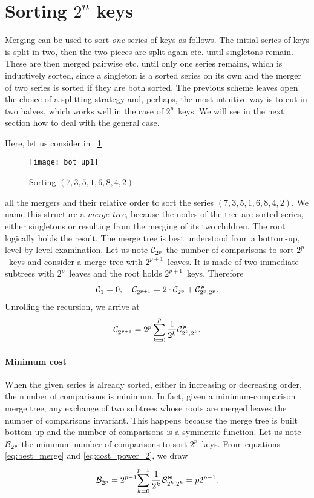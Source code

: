 \section{Sorting $2^n$ keys}

Merging can be used to sort \emph{one} series of keys as follows. The
initial series of keys is split in two, then the two pieces are split
again etc. until singletons remain. These are then merged pairwise
etc. until only one series remains, which is inductively sorted, since
a singleton is a sorted series on its own and the merger of two series
is sorted if they are both sorted. The previous scheme leaves open the
choice of a splitting strategy and, perhaps, the most intuitive way is
to cut in two halves, which works well in the case of \(2^p\)~keys. We
will see in the next section how to deal with the general case.

Here, let us consider in \fig~\ref{fig:bot_up1}
\begin{figure}
\centering
\texttt{[image: bot\_up1]}
\caption{Sorting \((7,3,5,1,6,8,4,2)\)
\label{fig:bot_up1}}
\end{figure}
all the mergers and their relative order to sort the series
\((7,3,5,1,6,8,4,2)\). We name this structure a \emph{merge tree},
because the nodes of the tree are sorted series, either singletons or
resulting from the merging of its two children. The root logically
holds the result. The merge tree is best understood from a
bottom\hyp{}up, level by level examination. Let us note \(\mathcal{C}_{2^p}^{}\)
the number of comparisons to sort \(2^p\)~keys and consider a merge
tree with \(2^{p+1}\)~leaves. It is made of two immediate subtrees
with \(2^p\)~leaves and the root holds \(2^{p+1}\)~keys. Therefore
\begin{equation*}
\mathcal{C}_{1}^{} = 0,
\quad
\mathcal{C}_{2^{p+1}}^{} = 2 \cdot \mathcal{C}_{2^p}^{} + \mathcal{C}_{2^p,2^p}^{\Join}.
\end{equation*}
Unrolling the recursion, we arrive at
\begin{equation}
\mathcal{C}_{2^{p+1}}^{} = 2^p\sum_{k=0}^p{\frac{1}{2^k}\mathcal{C}_{2^k,2^k}^{\Join}}.
\label{eq:cost_power_2}
\end{equation}

\paragraph{Minimum cost}

When the given series is already sorted, either in increasing or
decreasing order, the number of comparisons is minimum. In fact, given
a minimum\hyp{}comparison merge tree, any exchange of two subtrees
whose roots are merged leaves the number of comparisons
invariant. This happens because the merge tree is built bottom\hyp{}up
and the number of comparisons is a symmetric function. Let us note
\(\mathcal{B}_{2^p}^{}\) the minimum number of comparisons to sort
\(2^p\)~keys. From equations \eqref{eq:best_merge} and
\eqref{eq:cost_power_2}, we draw
\begin{equation}
\belowdisplayskip=0pt
\B{}{2^p}
  = 2^{p-1}\!\sum_{k=0}^{p-1}{\frac{1}{2^k}\B{\Join}{2^k,2^k}}
  = p2^{p-1}.\label{eq:best_power}
\end{equation}

